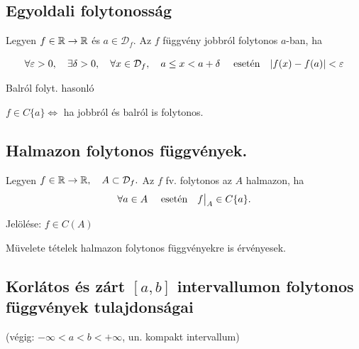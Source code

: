 \documentclass[a4paper,11.5pt]{article}
\begin{document}
	\subsection{\textbf{Egyoldali folytonosság}}
		
		\begin{definition}
			Legyen $f\in\mathbb{R}\to\mathbb{R}$ és $a\in\mathcal{D}_f$. Az $f$ függvény  jobbról folytonos $a$-ban, ha
		
			\[\forall \varepsilon>0, \quad \exists \delta>0,\quad  \forall x\in\mathcal{D}_f,\quad  a\leq x< a + \delta \text{ \quad esetén\quad  } |f(x)-f(a)|<\varepsilon  \]
		\end{definition}
		\begin{note}
			Balról folyt. hasonló
		\end{note}
		\begin{theorem}
			$f\in C\{a\} \Leftrightarrow$ ha jobbról és balról is folytonos.
		\end{theorem}
		
	\subsection{\textbf{Halmazon folytonos függvények.}}
	
		\begin{definition}
			Legyen $f\in\mathbb{R}\to\mathbb{R},\quad  A\subset\mathcal{D}_f.$ Az $f$ fv. folytonos az $A$ halmazon, ha 
			\[ \forall a\in A\text{ \quad esetén\quad  } f\big|_A \in C\{a\}.\]
			
			Jelölése: $f\in C(A)$
		\end{definition}
		
		\begin{note}
			Müvelete tételek halmazon folytonos függvényekre is érvényesek.
		\end{note}
	\subsection{Korlátos és zárt $[a,b]$ intervallumon folytonos függvények tulajdonságai}
		(végig: $-\infty <a<b<+\infty$, un. kompakt intervallum)
	
\end{document}
